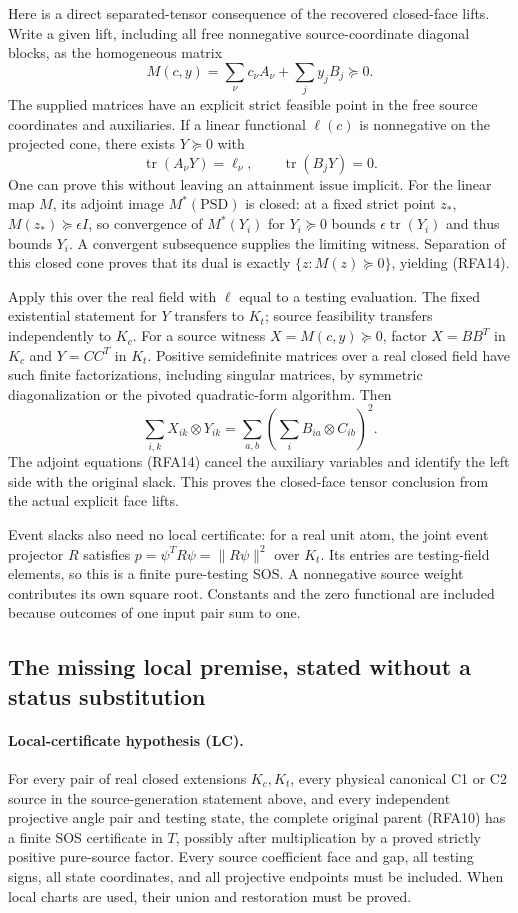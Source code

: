 Here is a direct separated-tensor consequence of the recovered
closed-face lifts. Write a given lift, including all free nonnegative
source-coordinate diagonal blocks, as the homogeneous matrix
\[
 M(c,y)=\sum_\nu c_\nu A_\nu+\sum_jy_jB_j\succeq0.
\]
The supplied matrices have an explicit strict feasible point in the
free source coordinates and auxiliaries. If a linear functional
$\ell(c)$ is nonnegative on the projected cone, there exists $Y\succeq0$
with
\[
 \operatorname{tr}(A_\nu Y)=\ell_\nu,\qquad
 \operatorname{tr}(B_jY)=0.                          \tag{RFA14}
\]
One can prove this without leaving an attainment issue implicit.
For the linear map $M$, its adjoint image $M^*(\mathrm{PSD})$ is
closed: at a fixed strict point $z_*$, $M(z_*)\succeq\epsilon I$,
so convergence of $M^*(Y_i)$ for $Y_i\succeq0$ bounds
$\epsilon\operatorname{tr}(Y_i)$ and thus bounds $Y_i$.
A convergent subsequence supplies the limiting witness. Separation
of this closed cone proves that its dual is exactly
$\{z:M(z)\succeq0\}$, yielding (RFA14).

Apply this over the real field with $\ell$ equal to a testing
evaluation. The fixed existential statement for $Y$ transfers to $K_t$;
source feasibility transfers independently to $K_c$. For a source
witness $X=M(c,y)\succeq0$, factor $X=BB^T$ in $K_c$ and
$Y=CC^T$ in $K_t$. Positive semidefinite matrices over a real closed
field have such finite factorizations, including singular matrices,
by symmetric diagonalization or the pivoted quadratic-form algorithm.
Then
\[
 \sum_{i,k}X_{ik}\otimes Y_{ik}
  =\sum_{a,b}\left(\sum_iB_{ia}\otimes C_{ib}\right)^2.
 \tag{RFA15}
\]
The adjoint equations (RFA14) cancel the auxiliary variables and identify
the left side with the original slack. This proves the closed-face
tensor conclusion from the actual explicit face lifts.

Event slacks also need no local certificate: for a real unit atom,
the joint event projector $R$ satisfies
$p=\psi^TR\psi=\|R\psi\|^2$ over $K_t$. Its entries are testing-field
elements, so this is a finite pure-testing SOS. A nonnegative source
weight contributes its own square root. Constants and the zero
functional are included because outcomes of one input pair sum to one.

\subsection{The missing local premise, stated without a status substitution}

\paragraph{Local-certificate hypothesis (LC).}
For every pair of real closed extensions $K_c,K_t$, every physical
canonical C1 or C2 source in the source-generation statement above,
and every independent projective angle pair and testing state, the
complete original parent (RFA10) has a finite SOS certificate in $T$,
possibly after multiplication by a proved strictly positive pure-source
factor. Every source coefficient face and gap, all testing signs,
all state coordinates, and all projective endpoints must be included.
When local charts are used, their union and restoration must be proved.

